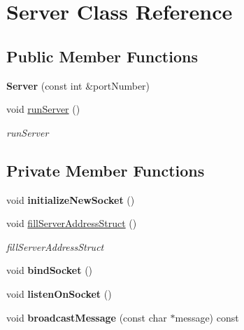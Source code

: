 \hypertarget{classServer}{}\section{Server Class Reference}
\label{classServer}
\subsection*{Public Member Functions}
\begin{DoxyCompactItemize}
\item 
\mbox{\label{classServer_a1a3d683f763e9a89a8f3a001404332e0}} 
{\bfseries Server} (const int \&port\+Number)
\item 
void \hyperlink{classServer_a5dfdd750d32aa4adbb4fdd8ba29b1224}{run\+Server} ()
\begin{DoxyCompactList}\small\item\em run\+Server \end{DoxyCompactList}\end{DoxyCompactItemize}
\subsection*{Private Member Functions}
\begin{DoxyCompactItemize}
\item 
\mbox{\label{classServer_ac47f99e1f4ab05e3d67b213514caf748}} 
void {\bfseries initialize\+New\+Socket} ()
\item 
void \hyperlink{classServer_a684bf0fce1ec62711a60d0cc3d25e8f8}{fill\+Server\+Address\+Struct} ()
\begin{DoxyCompactList}\small\item\em fill\+Server\+Address\+Struct \end{DoxyCompactList}\item 
\mbox{\label{classServer_a8d86edf1df9f12df07dc6e949d70f77f}} 
void {\bfseries bind\+Socket} ()
\item 
\mbox{\label{classServer_ab021d8bdec2e65ef97537b9542e946a2}} 
void {\bfseries listen\+On\+Socket} ()
\item 
\mbox{\label{classServer_a0ca5d8b118ec963af90ffce050988753}} 
void {\bfseries broadcast\+Message} (const char $\ast$message) const
\end{DoxyCompactItemize}

